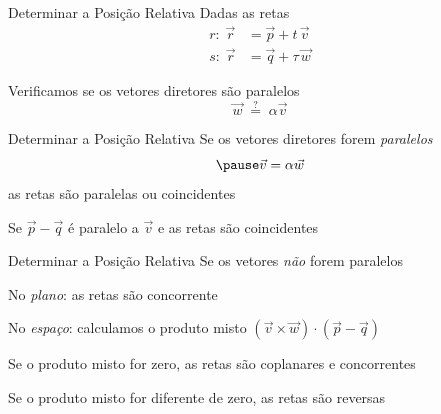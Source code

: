 \documentclass[fleqn,aspectratio=169,12pt]{beamer}
\begin{document}
\begin{frame}{Determinar a Posição Relativa}
  Dadas as retas
  \begin{align*}
    r\colon \; \vec{r} & = \vec{p} + t    \, \vec{v} \\
    s\colon \; \vec{r} & = \vec{q} + \tau \, \vec{w}
  \end{align*}

  \pause
  Verificamos se os vetores diretores são paralelos
  \[
    \vec{w} \;\stackrel{?}{=}\; \alpha \vec{v}
  \]
\end{frame}

\begin{frame}{Determinar a Posição Relativa}
  Se os vetores diretores forem \emph{paralelos}
  \[
    \pause
    \vec{v} = \alpha \vec{w}
  \]
  \pause
  as retas são paralelas ou coincidentes

  \bigskip
  \pause
  Se
  \(
    \vec{p}-\vec{q}
  \)
  \pause
  é paralelo a \(\vec{v}\)
  \pause
  e as retas são coincidentes
\end{frame}

\begin{frame}{Determinar a Posição Relativa}
  Se os vetores \emph{não} forem paralelos

  \bigskip
  \pause
  No \emph{plano}: as retas são concorrente

  \bigskip
  \pause
  No \emph{espaço}: calculamos o produto misto \;
  \(
    \left(\vec{v} \times \vec{w}\right) \cdot \left(\vec{p}-\vec{q}\right)
  \)

  \medskip
  \pause
  \qquad Se o produto misto for zero,
  \pause
  as retas são coplanares e concorrentes

  \pause
  \qquad Se o produto misto for diferente de zero,
  \pause
  as retas são reversas
\end{frame}

%

%
%

\end{document}
